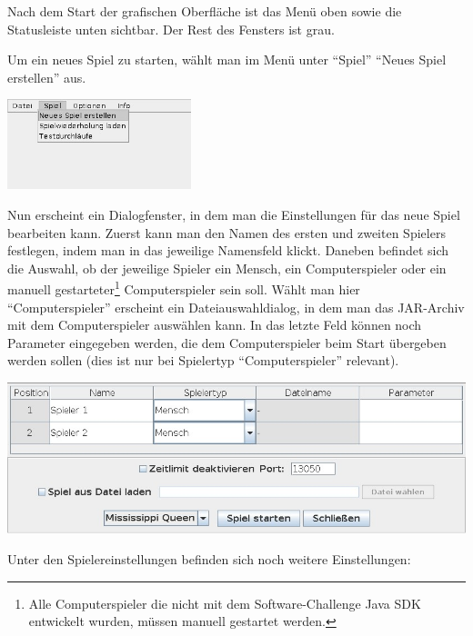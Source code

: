 \documentclass[12pt,a4paper, ngerman, oneside]{scrartcl}
\begin{document}
Nach dem Start der grafischen Oberfläche ist das Menü oben sowie die Statusleiste unten sichtbar. Der Rest des Fensters ist grau.

Um ein neues Spiel zu starten, wählt man im Menü unter ``Spiel'' ``Neues Spiel
erstellen'' aus.

{%
\centering%
\includegraphics[width=0.4\textwidth]{bilder/neues-spiel-menu.jpg}
}

Nun erscheint ein Dialogfenster, in dem man die Einstellungen für das neue Spiel
bearbeiten kann. Zuerst kann man den Namen des ersten und zweiten Spielers
festlegen, indem man in das jeweilige Namensfeld klickt. Daneben befindet sich
die Auswahl, ob der jeweilige Spieler ein Mensch, ein Computerspieler oder ein
manuell gestarteter\footnote{Alle Computerspieler die nicht mit dem
  Software-Challenge Java SDK entwickelt wurden, müssen manuell gestartet
  werden.} Computerspieler sein soll. Wählt man hier ``Computerspieler''
erscheint ein Dateiauswahldialog, in dem man das JAR-Archiv mit dem
Computerspieler auswählen kann. In das letzte Feld können noch Parameter
eingegeben werden, die dem Computerspieler beim Start übergeben werden sollen
(dies ist nur bei Spielertyp ``Computerspieler'' relevant).

\begin{centering}
  \includegraphics[width=\textwidth]{bilder/neues-spiel-dialog.jpg}
\end{centering}

Unter den Spielereinstellungen befinden sich noch weitere Einstellungen:
\end{document}

